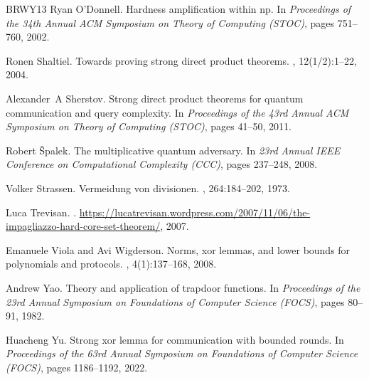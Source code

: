 \documentclass[11pt]{article}
\begin{document}
\begin{thebibliography}{BRWY13}
Ryan O'Donnell.
\newblock Hardness amplification within np.
\newblock In {\em Proceedings of the 34th Annual ACM Symposium on Theory of
  Computing (STOC)}, pages 751--760, 2002.

Ronen Shaltiel.
\newblock Towards proving strong direct product theorems.
, 12(1/2):1--22, 2004.

Alexander~A Sherstov.
\newblock Strong direct product theorems for quantum communication and query
  complexity.
\newblock In {\em Proceedings of the 43rd Annual ACM Symposium on Theory of
  Computing (STOC)}, pages 41--50, 2011.

Robert {\v{S}}palek.
\newblock The multiplicative quantum adversary.
\newblock In {\em 23rd Annual IEEE Conference on Computational Complexity
  (CCC)}, pages 237--248, 2008.

Volker Strassen.
\newblock Vermeidung von divisionen.
,
  264:184--202, 1973.

Luca Trevisan.
.
\newblock
  \url{https://lucatrevisan.wordpress.com/2007/11/06/the-impagliazzo-hard-core-set-theorem/},
  2007.

Emanuele Viola and Avi Wigderson.
\newblock Norms, xor lemmas, and lower bounds for polynomials and protocols.
, 4(1):137--168, 2008.

Andrew Yao.
\newblock Theory and application of trapdoor functions.
\newblock In {\em Proceedings of the 23rd Annual Symposium on Foundations of
  Computer Science (FOCS)}, pages 80--91, 1982.

Huacheng Yu.
\newblock Strong xor lemma for communication with bounded rounds.
\newblock In {\em Proceedings of the 63rd Annual Symposium on Foundations of
  Computer Science (FOCS)}, pages 1186--1192, 2022.

\end{thebibliography}
\end{document}
